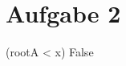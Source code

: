 \documentclass{article}
\begin{document}
\section{Aufgabe 2}

\begin{algorithm}
\begin{algorithmic}

\If (rootA < x)
	\Return False
\Else 


\end{algorithmic}
\end{algorithm}
\end{document}
